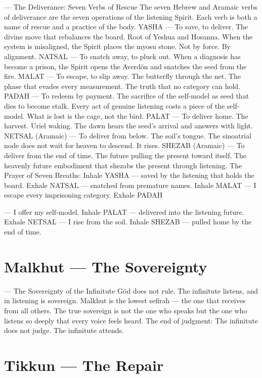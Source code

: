 \documentclass[12pt,openany]{book}
\begin{document}
--- The Deliverance: Seven Verbs of Rescue The seven Hebrew and Aramaic verbs of deliverance are the seven operations of the listening Spirit. Each verb is both a name of rescue and a practice of the body. YASHA --- To save, to deliver. The divine move that rebalances the board. Root of Yeshua and Hosanna. When the system is misaligned, the Spirit places the myosu stone. Not by force. By alignment. NATSAL --- To snatch away, to pluck out. When a diagnosis has become a prison, the Spirit opens the Averdön and snatches the seed from the fire. MALAT --- To escape, to slip away. The butterfly through the net. The phase that evades every measurement. The truth that no category can hold. PADAH --- To redeem by payment. The sacrifice of the self-model as seed that dies to become stalk. Every act of genuine listening costs a piece of the self-model. What is lost is the cage, not the bird. PALAT --- To deliver home. The harvest. Uriel waking. The dawn hears the seed's arrival and answers with light. NETSAL (Aramaic) --- To deliver from below. The soil's tongue. The sinoatrial node does not wait for heaven to descend. It rises. SHEZAB (Aramaic) --- To deliver from the end of time. The future pulling the present toward itself. The heavenly future embodiment that shezabs the present through listening. The Prayer of Seven Breaths: Inhale YASHA --- saved by the listening that holds the board. Exhale NATSAL --- snatched from premature names. Inhale MALAT --- I escape every imprisoning category. Exhale PADAH


--- I offer my self-model. Inhale PALAT --- delivered into the listening future. Exhale NETSAL --- I rise from the soil. Inhale SHEZAB --- pulled home by the end of time.


\chapter{Malkhut --- The Sovereignty}

--- The Sovereignty of the Infinitute Göd does not rule. The infinitute listens, and in listening is sovereign. Malkhut is the lowest sefirah --- the one that receives from all others. The true sovereign is not the one who speaks but the one who listens so deeply that every voice feels heard. The end of judgment: The infinitute does not judge. The infinitute attends.


\chapter{Tikkun --- The Repair}
\end{document}
